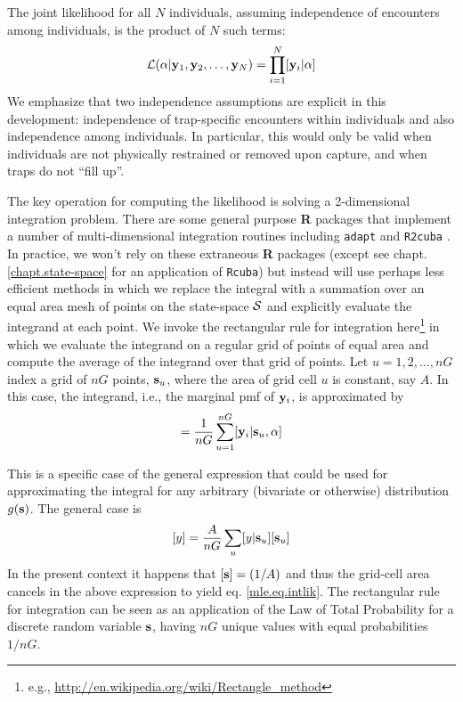 The joint likelihood for all $N$ individuals, assuming independence of
encounters among individuals, is the product of $N$ such terms:
\[
{\cal L}(\alpha | {\bf y}_{1},{\bf y}_{2},\ldots, {\bf y}_{N}) =     \prod_{i=1}^{N}
[{\bf y}_{i}|\alpha]
\]
We emphasize that two independence assumptions are explicit in this
development: independence of trap-specific encounters within
individuals and also independence among individuals. In particular,
this would only be valid when individuals are not physically
restrained or removed upon capture, and when traps do not ``fill up''.

The key operation for computing the likelihood is solving a
2-dimensional integration problem. There are some general purpose {\bf
  R} packages that implement a number of 
 multi-dimensional integration routines
including \mbox{\tt adapt} \citep{genz_etal:2007} and \mbox{\tt R2cuba}
\citep{hahn_etal:2011}.  In practice, we won't rely
on these extraneous {\bf R} packages (except see
chapt. \ref{chapt.state-space} for an application of \mbox{\tt Rcuba})
but instead will use perhaps less
efficient methods in which we replace the integral with a summation
over an equal area mesh of points on the state-space ${\cal S}$ and explicitly
evaluate the integrand at each point. We invoke the rectangular rule
for integration here\footnote{e.g., 
\url{http://en.wikipedia.org/wiki/Rectangle_method}
} in which we
evaluate the
integrand on a regular grid of points of equal area and compute the
average of
the integrand over that grid of points. 
Let $u=1,2,\ldots,nG$ index a grid of
$nG$ points, ${\bf s}_{u}$,  where the area of grid cell $u$ is
constant, say $A$.
In this case, the integrand, i.e., the marginal pmf of 
${\bf y}_{i}$, is approximated by  
\begin{equation}
         [{\bf y}_{i}|\alpha] = \frac{1}{nG} \sum_{u=1}^{nG}  [ {\bf
            y}_{i} |{\bf s}_u, \alpha]
\label{mle.eq.intlik}
\end{equation}

This is a specific case of the general expression that could be used
for approximating the integral for any arbitrary (bivariate or otherwise)
distribution $g({\bf s})$. The general case is
\[
[y]  = \frac{A}{nG} \sum_{u} [y|{\bf s}_{u}] [{\bf s}_{u}]
\]
 In the present context it happens that  $[{\bf s}] = (1/A)$
and thus the grid-cell area cancels in the above
expression to yield eq. \ref{mle.eq.intlik}.
The rectangular rule for integration can be seen as an application of
the Law of Total Probability for a discrete random variable ${\bf
  s}$, having $nG$ 
unique values with equal probabilities $1/nG$.



